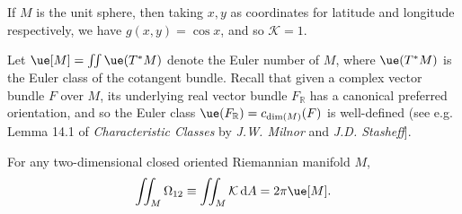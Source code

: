 \documentclass[a4paper,openany]{scrbook}
\newcommand{\ud}{\mathrm{d}}
\begin{document}
\begin{Example}\label{gcsphere}
If $M$ is the unit sphere, then taking $x,y$ as coordinates for latitude and longitude respectively, we have $g(x,y)=\cos x$, and so $\mathcal{K}=1$.
\end{Example}

Let $\ue[M]=\iint\ue(T^*M)$ denote the Euler number of $M$, where $\ue(T^*M)$ is the Euler class of the cotangent bundle. Recall that given a complex vector bundle $F$ over $M$, its underlying real vector bundle $F_\mathbb{R}$ has a canonical preferred orientation, and so the Euler class $\ue(F_\mathbb{R})=c_{\dim(M)}(F)$ is well-defined (see e.g. Lemma 14.1 of \emph{Characteristic Classes} by \emph{J.W. Milnor} and \emph{J.D. Stasheff}].

\begin{theorem}
For any two-dimensional closed oriented Riemannian manifold $M$,
\begin{equation}
\iint_M\Omega_{12}\equiv\iint_M\mathcal{K}\,\ud A=2\pi\ue[M].
\end{equation}
\end{theorem}
\end{document}

